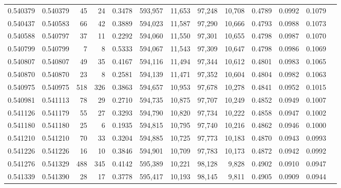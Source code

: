 \begin{tabular}{rrrrrrrrrrrrr}
0.540379 & 0.540379 &    45 &    24 &                                     0.3478 & 593,957 &  11,653 &  97,248 &  10,708 & 0.4789 & 0.0992 & 0.1079 \\
0.540437 & 0.540583 &    66 &    42 &                                     0.3889 & 594,023 &  11,587 &  97,290 &  10,666 & 0.4793 & 0.0988 & 0.1073 \\
0.540588 & 0.540797 &    37 &    11 &                                     0.2292 & 594,060 &  11,550 &  97,301 &  10,655 & 0.4798 & 0.0987 & 0.1070 \\
0.540799 & 0.540799 &     7 &     8 &                                     0.5333 & 594,067 &  11,543 &  97,309 &  10,647 & 0.4798 & 0.0986 & 0.1069 \\
0.540807 & 0.540807 &    49 &    35 &                                     0.4167 & 594,116 &  11,494 &  97,344 &  10,612 & 0.4801 & 0.0983 & 0.1065 \\
0.540870 & 0.540870 &    23 &     8 &                                     0.2581 & 594,139 &  11,471 &  97,352 &  10,604 & 0.4804 & 0.0982 & 0.1063 \\
0.540975 & 0.540975 &   518 &   326 &                                     0.3863 & 594,657 &  10,953 &  97,678 &  10,278 & 0.4841 & 0.0952 & 0.1015 \\
0.540981 & 0.541113 &    78 &    29 &                                     0.2710 & 594,735 &  10,875 &  97,707 &  10,249 & 0.4852 & 0.0949 & 0.1007 \\
0.541126 & 0.541179 &    55 &    27 &                                     0.3293 & 594,790 &  10,820 &  97,734 &  10,222 & 0.4858 & 0.0947 & 0.1002 \\
0.541180 & 0.541180 &    25 &     6 &                                     0.1935 & 594,815 &  10,795 &  97,740 &  10,216 & 0.4862 & 0.0946 & 0.1000 \\
0.541210 & 0.541210 &    70 &    33 &                                     0.3204 & 594,885 &  10,725 &  97,773 &  10,183 & 0.4870 & 0.0943 & 0.0993 \\
0.541226 & 0.541226 &    16 &    10 &                                     0.3846 & 594,901 &  10,709 &  97,783 &  10,173 & 0.4872 & 0.0942 & 0.0992 \\
0.541276 & 0.541329 &   488 &   345 &                                     0.4142 & 595,389 &  10,221 &  98,128 &   9,828 & 0.4902 & 0.0910 & 0.0947 \\
0.541339 & 0.541390 &    28 &    17 &                                     0.3778 & 595,417 &  10,193 &  98,145 &   9,811 & 0.4905 & 0.0909 & 0.0944 \\

\end{tabular}
